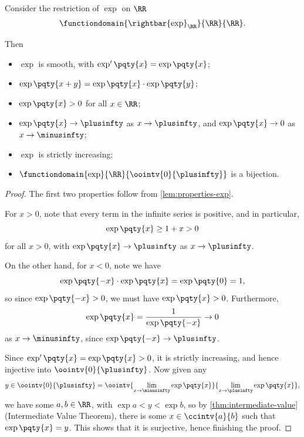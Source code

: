 \begin{lemma}
    \label{lem:properties-exp-r}%
    Consider the restriction of \(\exp\) on \(\RR\)
    \[
        \functiondomain{\rightbar{\exp}_{\RR}}{\RR}{\RR}.
    \]

    Then
    \begin{itemize}
        \item \(\exp\) is smooth, with \(\exp'\pqty{x} = \exp\pqty{x}\);
        \item \(\exp\pqty{x + y} = \exp\pqty{x} \cdot \exp\pqty{y}\);
        \item \(\exp\pqty{x} > 0\) for all \(x \in \RR\);
        \item \(\exp \pqty{x} \to \plusinfty\) as \(x \to \plusinfty\), and \(\exp \pqty{x} \to 0\) as \(x \to \minusinfty\);
        \item \(\exp\) is strictly increasing;
        \item \(\functiondomain{\exp}{\RR}{\oointv{0}{\plusinfty}}\) is a bijection.
    \end{itemize}
\end{lemma}

\begin{proof}
    The first two properties follow from \autoref{lem:properties-exp}.

    For \(x > 0\), note that every term in the infinite series is positive, and in particular,
    \[
        \exp\pqty{x} \geq 1 + x > 0
    \]
    for all \(x > 0\), with \(\exp\pqty{x} \to \plusinfty\) as \(x \to \plusinfty\).

    On the other hand, for \(x < 0\), note we have
    \[
        \exp\pqty{-x} \cdot \exp\pqty{x} = \exp\pqty{0} = 1,
    \]
    so since \(\exp\pqty{-x} > 0\), we must have \(\exp\pqty{x} > 0\). Furthermore,
    \[
        \exp\pqty{x} = \frac{1}{\exp\pqty{-x}} \to 0
    \]
    as \(x \to \minusinfty\), since \(\exp\pqty{-x} \to \plusinfty\).

    Since \(\exp'\pqty{x} = \exp\pqty{x} > 0\), it is strictly increasing, and hence injective into \(\oointv{0}{\plusinfty}\). Now given any
    \[
        y \in \oointv{0}{\plusinfty} = \oointv{\lim_{x \to \minusinfty} \exp\pqty{x}}{\lim_{x \to \plusinfty} \exp\pqty{x}},
    \]
    we have some \(a, b \in \RR\), with \(\exp a < y < \exp b\), so by \autoref{thm:intermediate-value} (Intermediate Value Theorem), there is some \(x \in \ccintv{a}{b}\) such that \(\exp\pqty{x} = y\). This shows that it is surjective, hence finishing the proof.
\end{proof}

